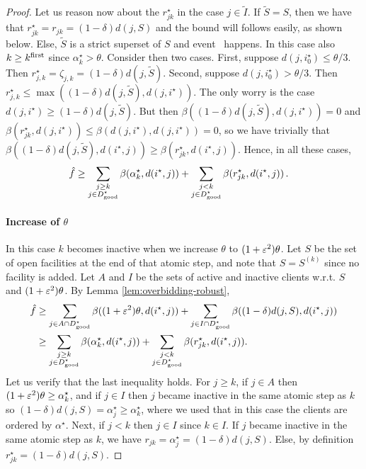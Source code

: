 \begin{proof}
    Let us reason now about the $r^\star_{jk}$ in the case $j \in \tilde I$.
    If $\tilde{S} = S$, then we have that $r^\star_{jk} = r_{jk} = (1-\delta) d(j, S)$ and the bound will follows easily, as shown below.
    Else, $\tilde{S}$ is a strict superset of $S$ and event \specialevent\ happens.
    In this case also $k \geq k^{\mathrm{first}}$ since $\alpha_k^\star > \theta$.
    Consider then two cases.
    First, suppose $d(j, i_0^\star) \leq \theta / 3$.
    Then $r_{j,k}^\star = \zeta_{j,k} = (1-\delta)d(j, \tilde S)$.
    Second, suppose $d(j, i_0^\star) > \theta / 3$.
    Then $r_{j,k}^\star \leq \max((1-\delta) d(j, \tilde S), d(j,i^\star))$.
    The only worry is the case $d(j, i^\star) \geq (1-\delta) d(j,\tilde S)$.
    But then $\beta((1-\delta)d(j,\tilde S), d(j, i^\star)) = 0$ and $\beta(r^\star_{jk}, d(j, i^\star)) \leq \beta(d(j,i^\star), d(j,i^\star))=0$, so we have trivially that $\beta((1-\delta) d(j,\tilde{S}), d(i^\star, j)) \geq \beta(r^\star_{jk}, d(i^\star, j))$.
    Hence, in all these cases,
    \begin{align*}
    \hat f
    &\geq \sum_{\substack{j \ge k\\ j \in D^\star_{\mathrm{good}}}} \beta(\alpha^\star_k, d(i^\star,j)) + \sum_{\substack{j < k\\ j \in D^\star_{\mathrm{good}}}} \beta(r^\star_{jk}, d(i^\star,j))\,.
    \end{align*}
    \paragraph{Increase of $\theta$}
    In this case $k$ becomes inactive when we increase $\theta$ to $(1+\varepsilon^2)\theta$.
    Let $S$ be the set of open facilities at the end of that atomic step, and note that $S=S^{(k)}$ since no facility is added.
    Let $A$ and $I$ be the sets of active and inactive clients w.r.t. $S$ and $(1+\varepsilon^2)\theta$.
    By Lemma \ref{lem:overbidding-robust},
    \begin{align*}
    \hat f
    &\ge \sum_{j \in A\cap D^\star_{\mathrm{good}}} \beta((1+\varepsilon^2)\theta, d(i^\star,j)) + \sum_{j \in I\cap D^\star_{\mathrm{good}}} \beta((1-\delta)d(j, S), d(i^\star,j))\\
    &\ge \sum_{\substack{j \ge k\\ j \in D^\star_{\mathrm{good}}}} \beta(\alpha^\star_k,  d(i^\star,j)) + \sum_{\substack{j < k\\ j \in D^\star_{\mathrm{good}}}} \beta(r^\star_{jk}, d(i^\star,j)).
    \end{align*}
    Let us verify that the last inequality holds. For $j \geq k$, if $j \in A$ then $(1+\varepsilon^2)\theta \geq \alpha_k^\star$, and if $j \in I$ then $j$ became inactive in the same atomic step as $k$ so $(1-\delta)d(j,S) = \alpha_j^\star \geq \alpha_k^\star$, where we used that in this case the clients are ordered by $\alpha^\star$.
    Next, if $j < k$ then $j \in I$ since $k \in I$. 
    If $j$ became inactive in the same atomic step as $k$, we have $r_{jk} = \alpha_j^\star = (1-\delta)d(j, S)$.
    Else, by definition $r^\star_{jk} = (1-\delta)d(j, S)$.
\end{proof}

